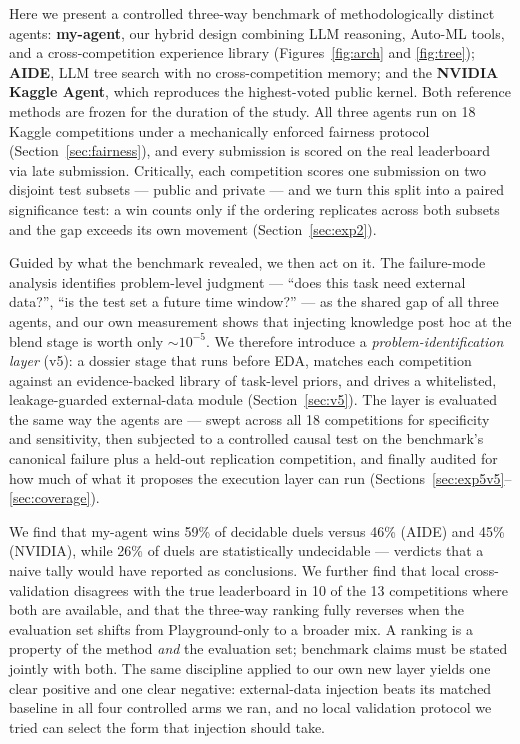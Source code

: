 \documentclass[11pt,a4paper]{article}
\begin{document}
Here we present a controlled three-way benchmark of methodologically distinct agents: \textbf{my-agent}, our hybrid design combining LLM reasoning, Auto-ML tools, and a cross-competition experience library (Figures~\ref{fig:arch} and \ref{fig:tree}); \textbf{AIDE}, LLM tree search with no cross-competition memory; and the \textbf{NVIDIA Kaggle Agent}, which reproduces the highest-voted public kernel. Both reference methods are frozen for the duration of the study. All three agents run on 18 Kaggle competitions under a mechanically enforced fairness protocol (Section~\ref{sec:fairness}), and every submission is scored on the real leaderboard via late submission. Critically, each competition scores one submission on two disjoint test subsets --- public and private --- and we turn this split into a paired significance test: a win counts only if the ordering replicates across both subsets and the gap exceeds its own movement (Section~\ref{sec:exp2}).

Guided by what the benchmark revealed, we then act on it. The failure-mode analysis identifies problem-level judgment --- ``does this task need external data?'', ``is the test set a future time window?'' --- as the shared gap of all three agents, and our own measurement shows that injecting knowledge post hoc at the blend stage is worth only ${\sim}10^{-5}$. We therefore introduce a \emph{problem-identification layer} (v5): a dossier stage that runs before EDA, matches each competition against an evidence-backed library of task-level priors, and drives a whitelisted, leakage-guarded external-data module (Section~\ref{sec:v5}). The layer is evaluated the same way the agents are --- swept across all 18 competitions for specificity and sensitivity, then subjected to a controlled causal test on the benchmark's canonical failure plus a held-out replication competition, and finally audited for how much of what it proposes the execution layer can run (Sections~\ref{sec:exp5v5}--\ref{sec:coverage}).

We find that my-agent wins 59\% of decidable duels versus 46\% (AIDE) and 45\% (NVIDIA), while 26\% of duels are statistically undecidable --- verdicts that a naive tally would have reported as conclusions. We further find that local cross-validation disagrees with the true leaderboard in 10 of the 13 competitions where both are available, and that the three-way ranking fully reverses when the evaluation set shifts from Playground-only to a broader mix. A ranking is a property of the method \emph{and} the evaluation set; benchmark claims must be stated jointly with both. The same discipline applied to our own new layer yields one clear positive and one clear negative: external-data injection beats its matched baseline in all four controlled arms we ran, and no local validation protocol we tried can select the form that injection should take.
\end{document}

